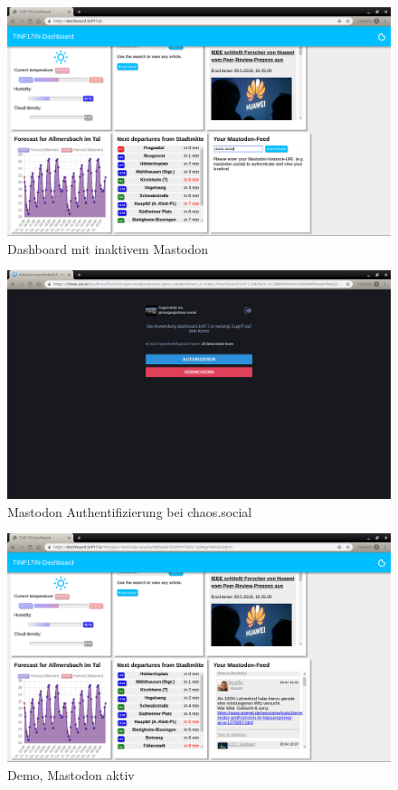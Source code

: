 \documentclass[fleqn,10pt]{SelfArx} %
\begin{document}
\begin{figure}
    \includegraphics[width=\linewidth]{images/1.png}
    \caption{Dashboard mit inaktivem Mastodon}\label{fig:demo1}
\end{figure}
\begin{figure}
\includegraphics[width=\linewidth]{images/2.png}
\caption{Mastodon Authentifizierung bei chaos.social}\label{fig:demo2}
\end{figure}

\begin{figure}
    \includegraphics[width=\linewidth]{images/3.png}
    \caption{Demo, Mastodon aktiv}\label{fig:demo3}
\end{figure}
\end{document}
